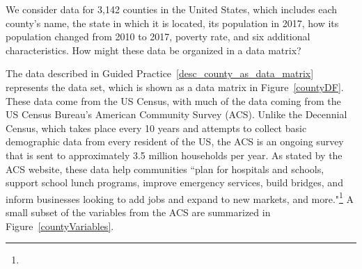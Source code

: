 
\begin{exercisewrap}
\begin{nexercise}\label{desc_county_as_data_matrix}%
We consider data for 3,142 counties in the United States,
which includes each county's name,
the state in which it is located, its population in 2017,
how its population changed from 2010 to 2017,
poverty rate,
and six additional characteristics.
How might these data be organized in
a data matrix?\footnotemark
\end{nexercise}
\end{exercisewrap}
\addtocounter{footnote}{-1}
\addtocounter{footnote}{1}

\noindent The data described in Guided
Practice~\ref{desc_county_as_data_matrix} represents the
 data set, which is shown as a data matrix
in Figure~\ref{countyDF}.
These data come from the US Census, with much of
the data coming from the US Census Bureau's American
Community Survey (ACS).
Unlike the Decennial Census, which takes place every 10 years and attempts to collect basic demographic data from every resident of the US, the ACS is an ongoing survey that is sent to approximately 3.5 million households per year.
As stated by the ACS website, these data help communities ``plan for hospitals and schools, support school lunch programs, improve emergency services, build bridges, and inform businesses looking to add jobs and expand to new markets, and more."\footnote{}
A small subset of the variables from the ACS are summarized in Figure~\ref{countyVariables}.

\D{\newpage}


